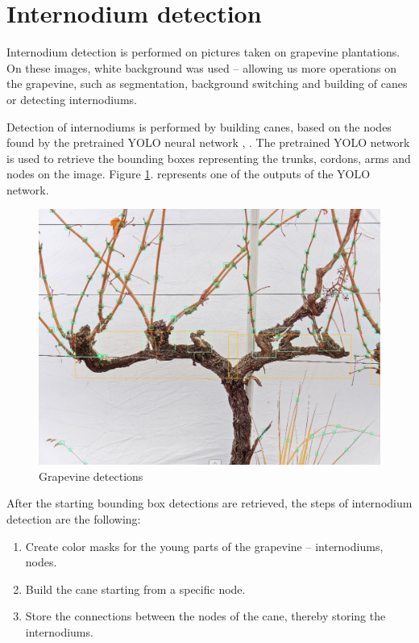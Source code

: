 \documentclass{PSAIE}%
\begin{document}
\section{Internodium detection} \label{sec_internodium_detection}
Internodium detection is performed on pictures taken on grapevine plantations. On these images, white
background was used -- allowing us more operations on the grapevine, such as segmentation, background
switching and building of canes or detecting internodiums.

Detection of internodiums is performed by building canes, based on the nodes found by the pretrained YOLO
neural network \cite{bolyki_2021}, \cite{glenn_jocher_2021_5563715}. The pretrained YOLO network is used
to retrieve the bounding boxes representing the trunks, cordons, arms and nodes on the image. Figure
\ref{fig_grapevine_YOLO}. represents one of the outputs of the YOLO network.

\begin{figure}[h]
      \centering
      \includegraphics[scale=0.33]{images/grapevine_yolo.png}
      \caption{Grapevine detections \cite{hellman2003grapevine}}
      \label{fig_grapevine_YOLO}
\end{figure}

After the starting bounding box detections are retrieved, the steps of internodium detection are the following:

\begin{enumerate}
      \item Create color masks for the young parts of the grapevine -- internodiums, nodes.
      \item Build the cane starting from a specific node.
      \item Store the connections between the nodes of the cane, thereby storing the internodiums.
\end{enumerate}
\end{document}

